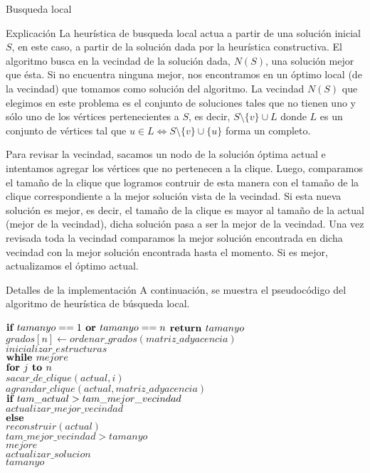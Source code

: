 \begin{section}{Busqueda local}
		\begin{subsection}{Explicación}
			La heurística de busqueda local actua a partir de una solución inicial $S$, en este caso, a partir de la solución dada por la heurística constructiva. El algoritmo busca en la vecindad de la solución dada, $N(S)$, una solución mejor que ésta. Si no encuentra ninguna mejor, nos encontramos en un óptimo local (de la vecindad) que tomamos como solución del algoritmo.
			La vecindad $N(S)$ que elegimos en este problema es el conjunto de soluciones tales que no tienen uno y sólo uno de los vértices pertenecientes a $S$, es decir, $S \setminus \{v\} \cup L$ donde $L$ es un conjunto de vértices tal que $u \in L \Longleftrightarrow S \setminus \{v\} \cup \{u\}$ forma un completo.

			Para revisar la vecindad, sacamos un nodo de la solución óptima actual e intentamos agregar los vértices que no pertenecen a la clique. Luego, comparamos el tamaño de la clique que logramos contruir de esta manera con el tamaño de la clique correspondiente a la mejor solución vista de la vecindad. Si esta nueva solución es mejor, es decir, el tamaño de la clique es mayor al tamaño de la actual (mejor de la vecindad), dicha solución pasa a ser la mejor de la vecindad. Una vez revisada toda la vecindad comparamos la mejor solución encontrada en dicha vecindad con la mejor solución encontrada hasta el momento. Si es mejor, actualizamos el óptimo actual.
		\end{subsection}
		\begin{subsection}{Detalles de la implementación}
			A continuación, se muestra el pseudocódigo del algoritmo de heurística de búsqueda local.\\

			\begin{pseudo}
				\tab $\textbf{if } tamanyo==1 \textbf{ or } tamanyo==n$
				\tab \tab $\textbf{return } tamanyo$
				\tab $grados[n] \leftarrow ordenar\_grados(matriz\_adyacencia)$\\
				\tab $inicializar\_estructuras$\\
				\tab $\textbf{while } mejore$\\
				\tab \tab $\textbf{for } j \textbf{ to } n$\\
				\tab \tab \tab $sacar\_de\_clique(actual,i)$\\
				\tab \tab \tab $agrandar\_clique(actual,matriz\_adyacencia)$\\
				\tab \tab \tab$\textbf{if } tam\_actual>tam\_mejor\_vecindad$\\
				\tab \tab \tab \tab $actualizar\_mejor\_vecindad$\\
				\tab \tab \tab$\textbf{else }$\\
				\tab \tab \tab \tab $reconstruir(actual)$\\
				\tab \tab \IF $tam\_mejor\_vecindad>tamanyo$\\
				\tab \tab \tab $mejore$\\
				\tab \tab \tab $actualizar\_solucion$\\
				\RET $tamanyo$\\
			\end{pseudo}


\end{subsection}
\end{section}
